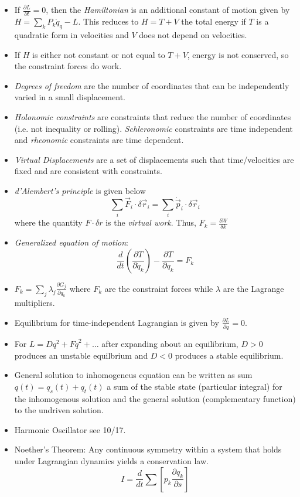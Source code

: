 \documentclass[10pt]{report}
\newcommand{\rd}[2]{\frac{d#1}{d#2}}
\newcommand{\pd}[2]{\frac{\partial #1}{\partial#2}}
\begin{document}
\begin{itemize}
    \item If $\pd{L}{t} = 0$, then the \emph{Hamiltonian} is an additional constant of motion given by $H=\sum_k P_k\dot{q}_q -L$. This reduces to $H=T+V$ the total energy if $T$ is a quadratic form in velocities and $V$ does not depend on velocities.
    \item If $H$ is either not constant or not equal to $T+V$, energy is not conserved, so the constraint forces do work.
    \item \emph{Degrees of freedom} are the number of coordinates that can be independently varied in a small displacement.
    \item \emph{Holonomic constraints} are constraints that reduce the number of coordinates (i.e. not inequality or rolling). \emph{Schleronomic} constraints are time independent and \emph{rheonomic} constraints are time dependent. 
    \item \emph{Virtual Displacements} are a set of displacements such that time/velocities are fixed and are consistent with constraints. 
    \item \emph{d'Alembert's principle} is given below
        $$\sum_i \vec{F}_i\cdot \delta\vec{r}_i = \sum_i \dot{\vec{p}}_i \cdot \delta\vec{r}_i$$
        where the quantity $F \cdot \delta r$ is the \emph{virtual work}. Thus, $F_k = \frac{\delta W}{\delta k}$
    \item \emph{Generalized equation of motion}:
        $$\rd{}{t}\left( \pd{T}{\dot{q}_k} \right) - \pd{T}{q_k} = F_k$$
    \item $F_k = \sum_j \lambda_j \pd{G_j}{q_k}$ where $F_k$ are the constraint forces while $\lambda$ are the Lagrange multipliers.
    \item Equilibrium for time-independent Lagrangian is given by $\pd{L}{q} = 0$.
    \item For $L = Dq^2 + F\dot{q}^2 + \dots$ after expanding about an equilibrium, $D > 0$ produces an unstable equilbrium and $D < 0$ produces a stable equilibrium.
    \item General solution to inhomogeneus equation can be written as sum $q(t) = q_s(t) + q_t(t)$ a sum of the stable state (particular integral) for the inhomogenous solution and the general solution (complementary function) to the undriven solution.
    \item Harmonic Oscillator see 10/17.
    \item Noether's Theorem: Any continuous symmetry within a system that holds under Lagrangian dynamics yields a conservation law. 
        $$I = \rd{}{t}\sum\left[ p_k \pd{q_k}{s} \right]$$

\end{itemize}
\end{document}
